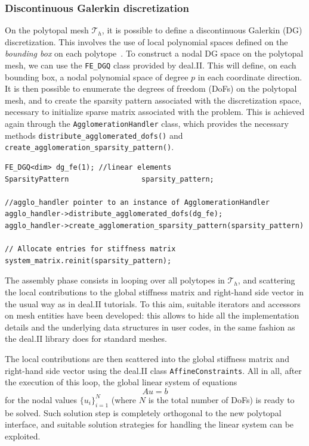 \documentclass[a4paper,12pt]{article}
\begin{document}
\subsubsection{Discontinuous Galerkin discretization}

On the polytopal mesh $\mathcal{T}_h$, it is possible to define a discontinuous
Galerkin (DG) discretization. This involves the use of local polynomial
spaces defined on the \emph{bounding box} on each polytope~\cite{polyDG}. To construct a nodal
DG space on the polytopal mesh, we can use the \texttt{FE\_DGQ} class provided by deal.II. This will define,
on each bounding box, a nodal polynomial space of degree $p$ in each coordinate direction. It is then possible to enumerate
the degrees of freedom (DoFs) on the polytopal mesh, and to
create the sparsity pattern associated with the discretization space, necessary to initialize
sparse matrix associated with the problem. This is achieved
again through the \texttt{AgglomerationHandler} class, which provides the necessary methods
\texttt{distribute\_agglomerated\_dofs()} and \texttt{create\_agglomeration\_sparsity\_pattern()}.


\begin{lstlisting}[caption=Distribution of DoFs on a polytopal mesh]
FE_DGQ<dim> dg_fe(1); //linear elements
SparsityPattern                 sparsity_pattern;

//agglo_handler pointer to an instance of AgglomerationHandler
agglo_handler->distribute_agglomerated_dofs(dg_fe);
agglo_handler->create_agglomeration_sparsity_pattern(sparsity_pattern)

// Allocate entries for stiffness matrix
system_matrix.reinit(sparsity_pattern);
\end{lstlisting}

The assembly phase consists in looping over all polytopes in $\mathcal{T}_h$, and
scattering the local contributions to the global stiffness matrix and
right-hand side vector in the usual way as in deal.II tutorials.
To this aim, suitable iterators and accessors on mesh entities have been developed: this allows
to hide all the implementation details and the underlying data structures in user codes, in the same fashion
as the deal.II library does for standard meshes.

The local contributions are then scattered into the global
stiffness matrix and right-hand side vector using the deal.II class \texttt{AffineConstraints}. All in all,
after the execution of this loop, the global linear system of equations $$Au = b$$ for the nodal values $\{u_i\}_{i=1}^N$ (where $N$ is the total number
of DoFs) is ready to be solved. Such solution
step is completely orthogonal to the new polytopal interface, and suitable solution strategies for
handling the linear system can be exploited.
\end{document}
